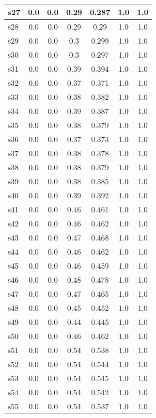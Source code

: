 \documentclass{article}
\begin{document}
\begin{tabular}{|l|c|c|c|c|c|c|}
s27 &0.0 & 0.0 & 0.29 & 0.287 & 1.0 & 1.0\\
\hline
s28 &0.0 & 0.0 & 0.29 & 0.29 & 1.0 & 1.0\\
\hline
s29 &0.0 & 0.0 & 0.3 & 0.299 & 1.0 & 1.0\\
\hline
s30 &0.0 & 0.0 & 0.3 & 0.297 & 1.0 & 1.0\\
\hline
s31 &0.0 & 0.0 & 0.39 & 0.394 & 1.0 & 1.0\\
\hline
s32 &0.0 & 0.0 & 0.37 & 0.371 & 1.0 & 1.0\\
\hline
s33 &0.0 & 0.0 & 0.38 & 0.382 & 1.0 & 1.0\\
\hline
s34 &0.0 & 0.0 & 0.39 & 0.387 & 1.0 & 1.0\\
\hline
s35 &0.0 & 0.0 & 0.38 & 0.379 & 1.0 & 1.0\\
\hline
s36 &0.0 & 0.0 & 0.37 & 0.373 & 1.0 & 1.0\\
\hline
s37 &0.0 & 0.0 & 0.38 & 0.378 & 1.0 & 1.0\\
\hline
s38 &0.0 & 0.0 & 0.38 & 0.379 & 1.0 & 1.0\\
\hline
s39 &0.0 & 0.0 & 0.38 & 0.385 & 1.0 & 1.0\\
\hline
s40 &0.0 & 0.0 & 0.39 & 0.392 & 1.0 & 1.0\\
\hline
s41 &0.0 & 0.0 & 0.46 & 0.461 & 1.0 & 1.0\\
\hline
s42 &0.0 & 0.0 & 0.46 & 0.462 & 1.0 & 1.0\\
\hline
s43 &0.0 & 0.0 & 0.47 & 0.468 & 1.0 & 1.0\\
\hline
s44 &0.0 & 0.0 & 0.46 & 0.462 & 1.0 & 1.0\\
\hline
s45 &0.0 & 0.0 & 0.46 & 0.459 & 1.0 & 1.0\\
\hline
s46 &0.0 & 0.0 & 0.48 & 0.478 & 1.0 & 1.0\\
\hline
s47 &0.0 & 0.0 & 0.47 & 0.465 & 1.0 & 1.0\\
\hline
s48 &0.0 & 0.0 & 0.45 & 0.452 & 1.0 & 1.0\\
\hline
s49 &0.0 & 0.0 & 0.44 & 0.445 & 1.0 & 1.0\\
\hline
s50 &0.0 & 0.0 & 0.46 & 0.462 & 1.0 & 1.0\\
\hline
s51 &0.0 & 0.0 & 0.54 & 0.538 & 1.0 & 1.0\\
\hline
s52 &0.0 & 0.0 & 0.54 & 0.544 & 1.0 & 1.0\\
\hline
s53 &0.0 & 0.0 & 0.54 & 0.545 & 1.0 & 1.0\\
\hline
s54 &0.0 & 0.0 & 0.54 & 0.542 & 1.0 & 1.0\\
\hline
s55 &0.0 & 0.0 & 0.54 & 0.537 & 1.0 & 1.0\\

\end{tabular}
\end{document}
